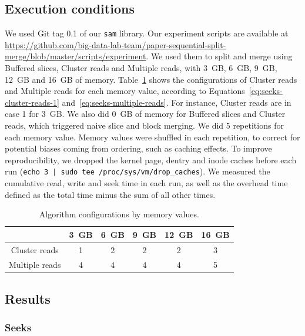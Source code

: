 \documentclass[10pt, conference, compsocconf]{IEEEtran}
\begin{document}
\subsection{Execution conditions}

We used Git tag 0.1 of our \texttt{sam} library. Our experiment
scripts are available at
\url{https://github.com/big-data-lab-team/paper-sequential-split-merge/blob/master/scripts/experiment}. We
used them to split and merge using Buffered slices, Cluster reads and
Multiple reads, with 3~GB, 6~GB, 9~GB, 12~GB and 16~GB of
memory. Table~\ref{table:configs} shows the configurations of Cluster
reads and Multiple reads for each memory value, according to
Equations~\ref{eq:seeks-cluster-reads-1}
and~\ref{eq:seeks-multiple-reads}. For instance, Cluster reads are in
case 1 for 3~GB. We also did 0~GB of memory for Buffered slices and
Cluster reads, which triggered naive slice and block merging. We did 5
repetitions for each memory value. Memory values were shuffled in each
repetition, to correct for potential biases coming from ordering, such
as caching effects. To improve reproducibility, we dropped the kernel
page, dentry and inode caches before each run (\texttt{echo 3 | sudo
  tee /proc/sys/vm/drop\_caches}). We measured the cumulative read,
write and seek time in each run, as well as the overhead time defined
as the total time minus the sum of all other times.
\begin{table}
  \centering
\begin{footnotesize}
\begin{tabular}{|c|ccccc|}
  \hline
                 & 3~GB & 6~GB & 9~GB & 12~GB & 16~GB\\
  \hline
  Cluster  reads &  1 &  2 &  2 &  2 &  3 \\
  Multiple reads &  4 &  4 &  4 &  4 &  5\\
  \hline
\end{tabular}
\end{footnotesize}
\caption{Algorithm configurations by memory values.}
\label{table:configs}
\end{table}

\subsection{Results}

\subsubsection{Seeks}
\end{document}
